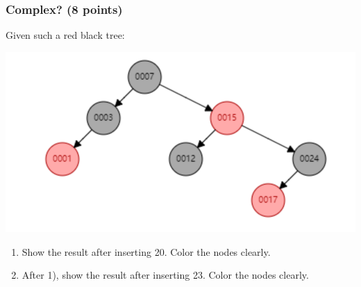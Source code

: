 \documentclass[11pt]{exam}
\begin{document}
\subsubsection{Complex? (8 points)}
Given such a red black tree:
\begin{center}
    \includegraphics[scale=0.3]{rb_tree_insert.png}
\end{center}
\begin{enumerate}[1)]
    \item Show the result after inserting 20. Color the nodes clearly.
    \begin{solution}
    \end{solution}
    \item After 1), show the result after inserting 23. Color the nodes clearly.
    \begin{solution}
    \end{solution}
\end{enumerate}
\end{document}
